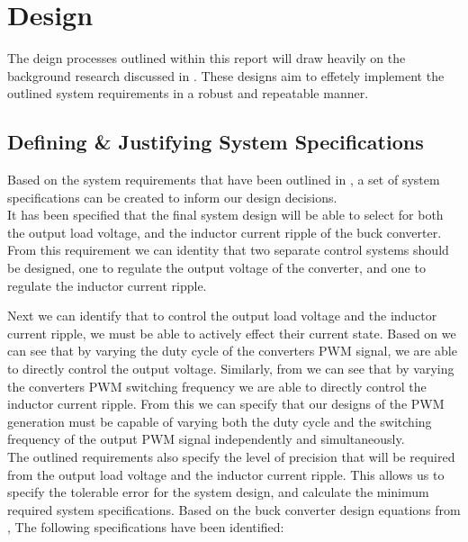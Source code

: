 \chapter{Design}\label{C:design}

The deign processes outlined within this report will draw heavily on the background research discussed in . These designs aim to effetely implement the outlined system requirements in a robust and repeatable manner.


%
%

\section{Defining \& Justifying System Specifications}\label{S:specs_design}

Based on the system requirements that have been outlined in , a set of system specifications can be created to inform our design decisions.\\

It has been specified that the final system design will be able to select for both the output load voltage, and the inductor current ripple of the buck converter. From this requirement we can identity that two separate control systems should be designed, one to regulate the output voltage of the converter, and one to regulate the inductor current ripple.

Next we can identify that to control the output load voltage and the inductor current ripple, we must be able to actively effect their current state. Based on  we can see that by varying the duty cycle of the converters PWM signal, we are able to directly control the output voltage. Similarly, from  we can see that by varying the converters PWM switching frequency we are able to directly control the inductor current ripple. From this we can specify that our designs of the PWM generation must be capable of varying both the duty cycle and the switching frequency of the output PWM signal independently and simultaneously. \\

The outlined requirements also specify the level of precision that will be required from the output load voltage and the inductor current ripple. This allows us to specify the tolerable error for the system design, and calculate the minimum required system specifications. Based on the buck converter design equations from , The following specifications have been identified:

